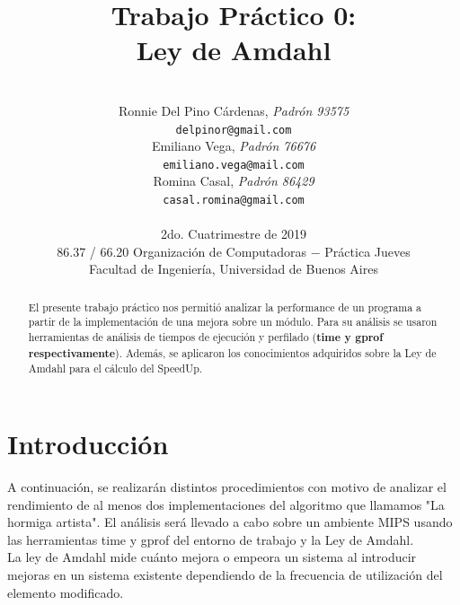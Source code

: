 \documentclass[a4paper, 10pt, twoside, notitlepage]{article}
\title{\textbf{Trabajo Práctico 0:\\Ley de Amdahl} \\}
\author{ \\
         Ronnie Del Pino Cárdenas, \textit{Padrón 93575} \\
          \texttt{ delpinor@gmail.com }       \\
		  [2.5ex]
         Emiliano Vega, \textit{Padrón 76676}     \\
          \texttt{emiliano.vega@mail.com}                      \\ 
		  [2.5ex]
	 Romina Casal, \textit{Padrón 86429} \\
          \texttt{casal.romina@gmail.com}                      \\ 
		  [2.5ex]
		 \\
         \normalsize{2do. Cuatrimestre de 2019}            \\
         \normalsize{86.37 / 66.20 Organización de Computadoras $-$ Práctica Jueves} \\
         \normalsize{Facultad de Ingeniería, Universidad de Buenos Aires} 
       }
\date{}
\begin{document}
\maketitle

\begin{abstract}
El presente trabajo práctico nos permitió analizar la performance de un programa a partir de la implementación de una mejora sobre un módulo. Para su análisis se usaron herramientas de análisis de tiempos de ejecución y perfilado (\textbf{time y gprof respectivamente}). Además, se aplicaron los conocimientos adquiridos sobre la Ley de Amdahl para el cálculo del SpeedUp.
\end{abstract}

% 
% 

\pagestyle{fancy}
\fancyhead{}
\fancyfoot{}
\renewcommand{\sectionmark}[1]{\markright{\thesection\ #1}}
\renewcommand{\headrulewidth}{0.4pt}
\fancyhead[LE]{\nouppercase \rightmark}
\fancyhead[RE, LO]{\bf \thepage}
\fancyhead[RO]{\nouppercase \rightmark}
\fancyfoot[C]{ }
\maketitle
\setcounter{page}{1}

\parskip 7.2pt
\section{Introducción}
A continuación, se realizarán distintos procedimientos con motivo de analizar el rendimiento de al menos dos implementaciones del algoritmo que llamamos "La hormiga artista". El análisis será llevado a cabo sobre un ambiente MIPS usando las herramientas time y gprof del entorno de trabajo y la Ley de Amdahl.\\

La ley de Amdahl mide cuánto mejora o empeora un sistema al introducir mejoras en un sistema existente dependiendo de la frecuencia de utilización del elemento modificado.\\
\end{document}

